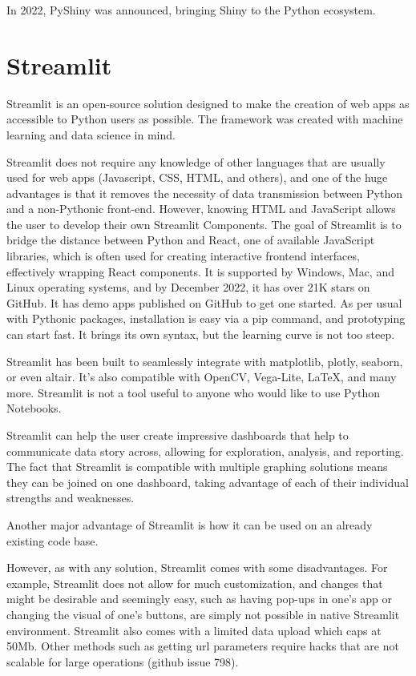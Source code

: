 In 2022, PyShiny was announced, bringing Shiny to the Python ecosystem.

\section{Streamlit}
\label{sec:streamlit}
Streamlit is an open-source solution designed to make the creation of web apps as accessible to Python users as possible. The framework was created with machine learning and data science in mind. 
 
Streamlit does not require any knowledge of other languages that are usually used for web apps (Javascript, CSS, HTML, and others), and one of the huge advantages is that it removes the necessity of data transmission between Python and a non-Pythonic front-end. However, knowing HTML and JavaScript allows the user to develop their own Streamlit Components. The goal of Streamlit is to bridge the distance between Python and React, one of available JavaScript libraries, which is often used for creating interactive frontend interfaces, effectively wrapping React components. It is supported by Windows, Mac, and Linux operating systems, and by December 2022, it has over 21K stars on GitHub. It has demo apps published on GitHub to get one started. As per usual with Pythonic packages, installation is easy via a pip command, and prototyping can start fast. It brings its own syntax, but the learning curve is not too steep. 

Streamlit has been built to seamlessly integrate with matplotlib, plotly, seaborn, or even altair. It's also compatible with OpenCV, Vega-Lite, LaTeX, and many more. Streamlit is not a tool useful to anyone who would like to use Python Notebooks.

Streamlit can help the user create impressive dashboards that help to communicate data story across, allowing for exploration, analysis, and reporting. The fact that Streamlit is compatible with multiple graphing solutions means they can be joined on one dashboard, taking advantage of each of their individual strengths and weaknesses. 

Another major advantage of Streamlit is how it can be used on an already existing code base.

However, as with any solution, Streamlit comes with some disadvantages. For example, Streamlit does not allow for much customization, and changes that might be desirable and seemingly easy, such as having pop-ups in one's app or changing the visual of one's buttons, are simply not possible in native Streamlit environment. Streamlit also comes with a limited data upload which caps at 50Mb. Other methods such as getting url parameters require hacks that are not scalable for large operations (github issue 798). 

